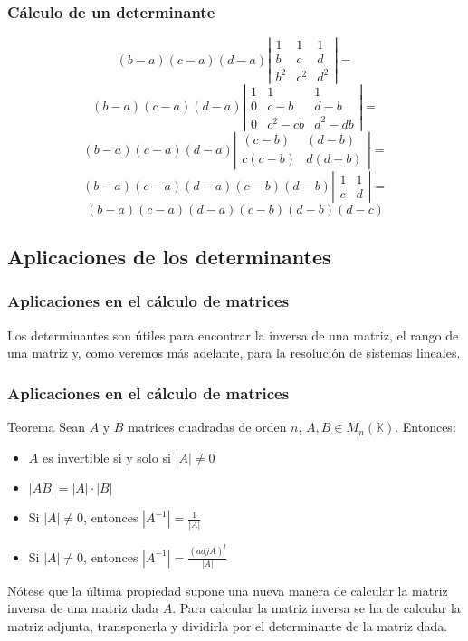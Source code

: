 \documentclass[aspectratio=169]{beamer}
\begin{document}
\begin{frame}
  \frametitle{C\'alculo de un determinante}
\[ (b-a)(c-a)(d-a)\left|\begin{array}{ccc} 1 & 1 & 1 \\ b & c & d \\b^2 & c^2 & d^2 \end{array}\right| =\]
\[ (b-a)(c-a)(d-a)\left|\begin{array}{ccc} 1 & 1 & 1 \\ 0 & c-b & d-b \\0 & c^2- cb & d^2-db \end{array}\right| =\]
\[ (b-a)(c-a)(d-a)\left|\begin{array}{cc}  (c-b) & (d-b) \\ c(c- b) & d(d-b) \end{array}\right| =\]
\[ (b-a)(c-a)(d-a)(c-b)(d-b)\left|\begin{array}{cc}  1 & 1 \\ c & d \end{array}\right| =\]
\[ (b-a)(c-a)(d-a)(c-b)(d-b) (d-c)\]

\end{frame} 


\subsection{Aplicaciones de los determinantes}

\begin{frame}
  \frametitle{Aplicaciones en el c\'alculo de matrices}
Los determinantes son \'utiles para encontrar la inversa de una matriz, el rango de una matriz y, como veremos m\'as adelante, para la resoluci\'on de sistemas lineales.
\end{frame}   
  
  \begin{frame}
  \frametitle{Aplicaciones en el c\'alculo de matrices}
     \begin{block}{Teorema}
Sean $A$ y $B$ matrices cuadradas de orden $n$, $A,B\in M_n(\mathbb{K})$. Entonces:
\begin{itemize}
\item $A$ es invertible si y solo si $|A|\neq 0$
\item $|AB| = |A| \cdot |B|$
\item Si $|A|\neq0$, entonces $|A^{-1}| = \frac{1}{|A|}$
\item Si $|A|\neq0$, entonces $|A^{-1}| = \frac{(adj A)^t}{|A|}$
\end{itemize}
\end{block}

N\'otese que la \'ultima propiedad supone una nueva manera de calcular la matriz inversa de una matriz dada $A$. Para calcular la matriz inversa se ha de calcular la matriz adjunta, transponerla y dividirla por el determinante de la matriz dada.
\end{frame} 
  
\end{document}
